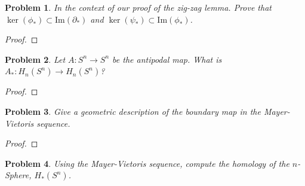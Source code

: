 \documentclass[10pt]{article}
\theoremstyle{plain}
\newtheorem{problem}{Problem}
\theoremstyle{remark}
\begin{document}
\begin{problem}
  In the context of our proof of the zig-zag lemma.
  Prove that $\ker(\phi_\ast) \subset \mathrm{Im}(\partial_\ast)$ and $\ker(\psi_\ast) \subset \mathrm{Im}(\phi_\ast)$.
\end{problem}

\begin{proof}

\end{proof}

\begin{problem}
  Let $A: S^n \to S^n$ be the antipodal map. What is $A_\ast : H_n(S^n) \to H_n(S^n)$?
\end{problem}

\begin{proof}

\end{proof}

\begin{problem}
  Give a geometric description of the boundary map in the Mayer-Vietoris sequence.
\end{problem}

\begin{proof}

\end{proof}

\begin{problem}
  Using the Mayer-Vietoris sequence, compute the homology of the $n$-Sphere, $H_\ast (S^n)$.
\end{problem}
\end{document}
